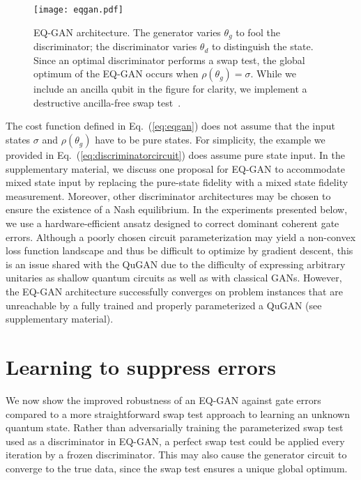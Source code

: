 \documentclass[prl,superscriptaddress,twocolumn]{revtex4}
\theoremstyle{plain}
\theoremstyle{definition}
\begin{document}
\begin{figure}[h!]
\begin{center}
\texttt{[image: eqgan.pdf]}

\caption{EQ-GAN architecture. The generator varies $\theta_g$ to fool the discriminator; the discriminator varies $\theta_d$ to distinguish the state. Since an optimal discriminator performs a swap test, the global optimum of the EQ-GAN occurs when $\rho(\theta_g) = \sigma$. While we include an ancilla qubit in the figure for clarity, we implement a destructive ancilla-free swap test~\cite{PhysRevA.87.052330}.}
\label{fig:eqgan}
\end{center}
\end{figure} 

The cost function defined in Eq.~(\ref{eq:eqgan}) does not assume that the input states $\sigma$ and $\rho(\theta_g)$ have to be pure states. For simplicity, the example we provided in Eq.~(\ref{eq:discriminatorcircuit}) does assume pure state input. In the supplementary material, we discuss one proposal for EQ-GAN to accommodate mixed state input by replacing the pure-state fidelity with a mixed state fidelity measurement. Moreover, other discriminator architectures may be chosen to ensure the existence of a Nash equilibrium. In the experiments presented below, we use a hardware-efficient ansatz designed to correct dominant coherent gate errors. Although a poorly chosen circuit parameterization may yield a non-convex loss function landscape and thus be difficult to optimize by gradient descent, this is an issue shared with the QuGAN due to the difficulty of expressing arbitrary unitaries as shallow quantum circuits as well as with classical GANs. However, the EQ-GAN architecture successfully converges on problem instances that are unreachable by a fully trained and properly parameterized a QuGAN (see supplementary material).


\section{Learning to suppress errors}%
We now show the improved robustness of an EQ-GAN against gate errors compared to a more straightforward swap test approach to learning an unknown quantum state. Rather than adversarially training the parameterized swap test used as a discriminator in EQ-GAN, a perfect swap test could be applied every iteration by a frozen discriminator. This may also cause the generator circuit to converge to the true data, since the swap test ensures a unique global optimum.
\end{document}
